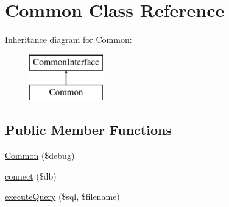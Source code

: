 \hypertarget{class_common}{}\section{Common Class Reference}
\label{class_common}
Inheritance diagram for Common\+:\begin{figure}[H]
\begin{center}
\leavevmode
\includegraphics[height=2.000000cm]{class_common}
\end{center}
\end{figure}
\subsection*{Public Member Functions}
\begin{DoxyCompactItemize}
\item 
\hyperlink{class_common_a4a9e6769ab6c946d0895e8d987df1c10}{Common} (\$debug)
\item 
\hyperlink{class_common_a1b1bd9b3f45a5fbd2549355282cdc96f}{connect} (\$db)
\item 
\hyperlink{class_common_a57a9dbd1203cf7b3ef3c5ce40d4047cc}{execute\+Query} (\$sql, \$filename)
\end{DoxyCompactItemize}
